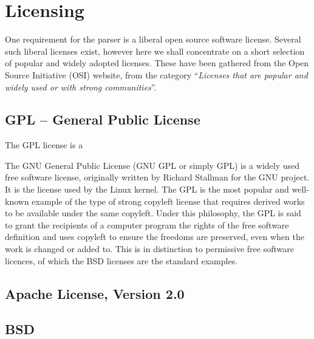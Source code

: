 \section{Licensing}
\label{sect:method:licensing}
One requirement for the parser is a liberal open source software license.
Several such liberal licenses exist, however here we shall concentrate on a
short selection of popular and widely adopted licenses. These have been gathered
from the Open Source Initiative (OSI) website\cite{osi_website}, from the
category
``\emph{Licenses that are popular and widely used or with strong communities}''.
\subsection{GPL -- General Public License}
The GPL license is a 

The GNU General Public License (GNU GPL or simply GPL) is a widely used free
software license, originally written by Richard Stallman for the GNU project.
It is the license used by the Linux kernel. The GPL is the most popular and
well-known example of the type of strong copyleft license that requires derived
works to be available under the same copyleft. Under this philosophy, the GPL
is said to grant the recipients of a computer program the rights of the free
software definition and uses copyleft to ensure the freedoms are preserved,
even when the work is changed or added to. This is in distinction to permissive
free software licences, of which the BSD licenses are the standard examples.   
     
\subsection{Apache License, Version 2.0}
\subsection{BSD}
